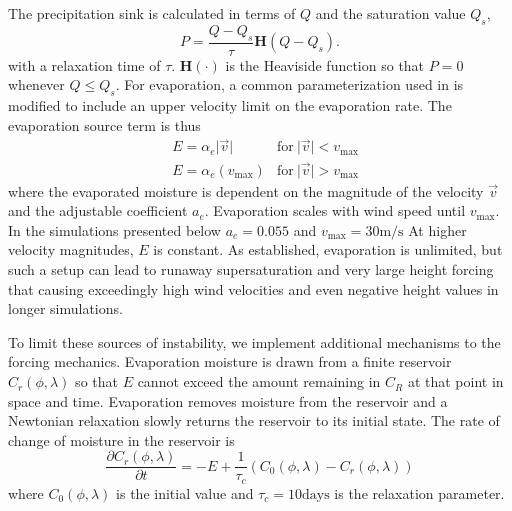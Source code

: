    The precipitation sink is calculated in terms of $Q$ and the saturation value $Q_s$,
   \begin{equation}
     \label{eq:precip} P = \frac{Q-Q_s}{\tau}\mathbf{H}(Q-Q_s).
   \end{equation}
   with a relaxation time of $\tau$. $\mathbf{H}(\cdot)$ is the Heaviside function
    so that $P = 0$ whenever $Q \leq Q_s$.
   For evaporation, a common parameterization used in \cite{lahaye2016understanding} is modified
   to include an upper velocity limit on the evaporation rate.  The evaporation source term is thus
     \begin{align}
        \label{eq:evap} 
     &E  =   \alpha_e  \lvert \vec{v} \rvert & \mathrm{for} \ \lvert \vec{v} \rvert < v_\mathrm{max} \nonumber \\
     &E  =   \alpha_e (v_\mathrm{max}) &  \mathrm{for} \ \lvert \vec{v} \rvert > v_\mathrm{max} 
     \end{align}
   where the evaporated moisture is dependent on the magnitude of the 
   velocity $\vec{v}$ and the adjustable coefficient $a_e$. Evaporation scales 
   with wind speed until $v_{\mathrm{max}}$. In the simulations presented below
   $a_e = 0.055$ and $v_{\mathrm{max}} = 30 \mathrm{m/s}$
   At higher velocity magnitudes, $E$ is constant.
   As established, evaporation is unlimited, but such a setup can lead to runaway 
   supersaturation and very large height forcing that causing exceedingly high wind 
   velocities and even negative height values in longer simulations.
    
    To limit these sources of instability, we implement additional mechanisms
    to the forcing mechanics. Evaporation moisture is drawn from a finite reservoir 
    $C_r(\phi,\lambda)$ so that $E$ cannot exceed the amount remaining in $C_R$ 
    at that point in space and time. Evaporation removes moisture from 
    the reservoir and a Newtonian relaxation slowly returns the reservoir to its initial state. 
    The rate of change of moisture in the reservoir is
    \begin{equation}
        \label{eq:ocean} 
        \frac{\partial C_r(\phi,\lambda)}{\partial t} = - E + \frac{1}{\tau_c}(C_0(\phi,\lambda) - C_r(\phi,\lambda))
    \end{equation}
    where $C_0(\phi,\lambda)$ is the initial value and $\tau_c = 10 \mathrm{ days}$ 
    is the relaxation parameter.
   
